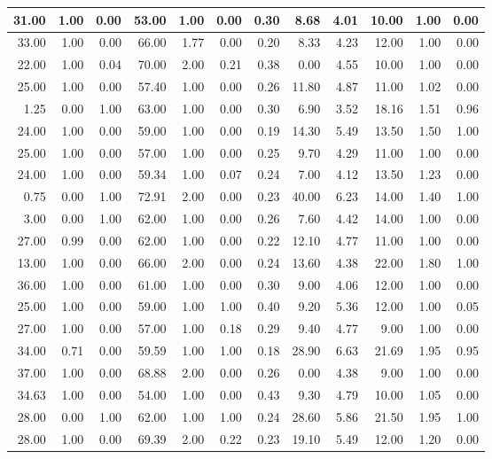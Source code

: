 \documentclass[
]{article}
\begin{document}
\begin{tabular}{r|r|r|r|r|r|r|r|r|r|r|r}
\hline
31.00 & 1.00 & 0.00 & 53.00 & 1.00 & 0.00 & 0.30 & 8.68 & 4.01 & 10.00 & 1.00 & 0.00\\
\hline
33.00 & 1.00 & 0.00 & 66.00 & 1.77 & 0.00 & 0.20 & 8.33 & 4.23 & 12.00 & 1.00 & 0.00\\
\hline
22.00 & 1.00 & 0.04 & 70.00 & 2.00 & 0.21 & 0.38 & 0.00 & 4.55 & 10.00 & 1.00 & 0.00\\
\hline
25.00 & 1.00 & 0.00 & 57.40 & 1.00 & 0.00 & 0.26 & 11.80 & 4.87 & 11.00 & 1.02 & 0.00\\
\hline
1.25 & 0.00 & 1.00 & 63.00 & 1.00 & 0.00 & 0.30 & 6.90 & 3.52 & 18.16 & 1.51 & 0.96\\
\hline
24.00 & 1.00 & 0.00 & 59.00 & 1.00 & 0.00 & 0.19 & 14.30 & 5.49 & 13.50 & 1.50 & 1.00\\
\hline
25.00 & 1.00 & 0.00 & 57.00 & 1.00 & 0.00 & 0.25 & 9.70 & 4.29 & 11.00 & 1.00 & 0.00\\
\hline
24.00 & 1.00 & 0.00 & 59.34 & 1.00 & 0.07 & 0.24 & 7.00 & 4.12 & 13.50 & 1.23 & 0.00\\
\hline
0.75 & 0.00 & 1.00 & 72.91 & 2.00 & 0.00 & 0.23 & 40.00 & 6.23 & 14.00 & 1.40 & 1.00\\
\hline
3.00 & 0.00 & 1.00 & 62.00 & 1.00 & 0.00 & 0.26 & 7.60 & 4.42 & 14.00 & 1.00 & 0.00\\
\hline
27.00 & 0.99 & 0.00 & 62.00 & 1.00 & 0.00 & 0.22 & 12.10 & 4.77 & 11.00 & 1.00 & 0.00\\
\hline
13.00 & 1.00 & 0.00 & 66.00 & 2.00 & 0.00 & 0.24 & 13.60 & 4.38 & 22.00 & 1.80 & 1.00\\
\hline
36.00 & 1.00 & 0.00 & 61.00 & 1.00 & 0.00 & 0.30 & 9.00 & 4.06 & 12.00 & 1.00 & 0.00\\
\hline
25.00 & 1.00 & 0.00 & 59.00 & 1.00 & 1.00 & 0.40 & 9.20 & 5.36 & 12.00 & 1.00 & 0.05\\
\hline
27.00 & 1.00 & 0.00 & 57.00 & 1.00 & 0.18 & 0.29 & 9.40 & 4.77 & 9.00 & 1.00 & 0.00\\
\hline
34.00 & 0.71 & 0.00 & 59.59 & 1.00 & 1.00 & 0.18 & 28.90 & 6.63 & 21.69 & 1.95 & 0.95\\
\hline
37.00 & 1.00 & 0.00 & 68.88 & 2.00 & 0.00 & 0.26 & 0.00 & 4.38 & 9.00 & 1.00 & 0.00\\
\hline
34.63 & 1.00 & 0.00 & 54.00 & 1.00 & 0.00 & 0.43 & 9.30 & 4.79 & 10.00 & 1.05 & 0.00\\
\hline
28.00 & 0.00 & 1.00 & 62.00 & 1.00 & 1.00 & 0.24 & 28.60 & 5.86 & 21.50 & 1.95 & 1.00\\
\hline
28.00 & 1.00 & 0.00 & 69.39 & 2.00 & 0.22 & 0.23 & 19.10 & 5.49 & 12.00 & 1.20 & 0.00\\

\end{tabular}
\end{document}
